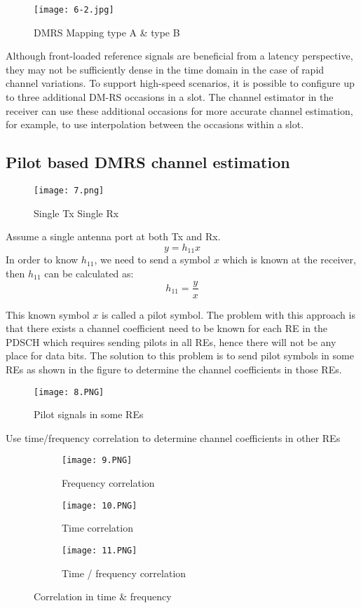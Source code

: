 \begin{figure}[ht]
\centering
\texttt{[image: 6-2.jpg]}
\caption{DMRS Mapping type A \& type B }
\end{figure}

Although front-loaded reference signals are beneficial from a latency perspective, they may not be sufficiently dense in the time domain in the case of rapid channel variations. To support high-speed scenarios, it is possible to configure up to three additional DM-RS occasions in a slot. The channel estimator in the receiver can use these additional occasions for more accurate channel estimation, for example, to use interpolation between the occasions within a slot.

\subsection{Pilot based DMRS channel estimation}
\begin{wrapfigure}{r}{0.4\textwidth}
    \centering
    \texttt{[image: 7.png]}
    \caption{Single Tx Single Rx}
\end{wrapfigure}

Assume a single antenna port at both Tx and Rx.
\[ y = h_{11} x \]
In order to know $h_11$, we need to send a symbol $x$ which is known at the receiver, then $h_11$ can be calculated as:
\[ h_{11} = \frac{y}{x} \]

This known symbol $x$ is called a pilot symbol.
The problem with this approach is that there exists a channel coefficient need to be known for each RE in the PDSCH which requires sending pilots in all REs, hence there will not be any place for data bits.
The solution to this problem is to send pilot symbols in some REs as shown in the figure to determine the channel coefficients in those REs.

\begin{figure}[ht]
\centering
\texttt{[image: 8.PNG]}
\caption{Pilot signals in some REs }
\end{figure}     

Use time/frequency correlation to determine channel coefficients in other REs

\begin{figure}[ht]
\centering
    \begin{subfigure}[b]{0.4\textwidth}
        \centering
        \texttt{[image: 9.PNG]}
        \caption{Frequency correlation }
    \end{subfigure}
    \hfill
    \begin{subfigure}[b]{0.4\textwidth}
        \centering
        \texttt{[image: 10.PNG]}
        \caption{Time correlation }
    \end{subfigure}
    \hfill
    \begin{subfigure}[c]{0.4\textwidth}
        \centering
        \texttt{[image: 11.PNG]}
        \caption{Time / frequency correlation }
    \end{subfigure}
       \caption{Correlation in time \& frequency}
\end{figure}

